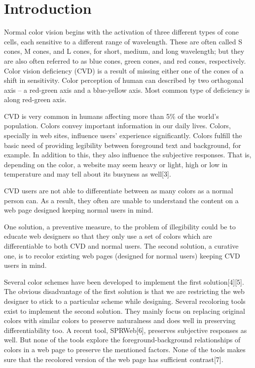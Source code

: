 \chapter{Introduction}
\thispagestyle{plain}

\label{Introduction}

Normal color vision begins with the activation of three different types of cone cells, each sensitive to a different range of wavelength.   These are often called S cones, M cones, and L cones, for short, medium, and long wavelength; but they are also often referred to as blue cones, green cones, and red cones, respectively. Color vision deficiency (CVD) is a result of missing either one of the cones of a shift in sensitivity. Color perception of human can described by two orthogonal axis – a red-green axis and a blue-yellow axis. Most common type of deficiency is  along red-green axis.

CVD is very common in humans affecting more than 5\% of the world's population. Colors convey important information in our daily lives. Colors, specially in web sites, influence users' experience significantly. Colors fulfill the basic need of providing legibility between foreground text and background, for example. In addition to this, they also influence the subjective responses. That is, depending on the color, a website may seem heavy or light, high or low in temperature and may tell about its busyness as well[3]. 

CVD users are not able to differentiate between as many colors as a normal person can. As a result, they often are unable to understand the content on a web page designed keeping normal users in mind.  
  
One solution, a preventive measure, to the problem of illegibility could be to educate web designers so that they only use a set of colors which are differentiable to both CVD and normal users. The second solution, a curative one, is to recolor existing web pages (designed for normal users) keeping CVD users in mind.

Several color schemes have been developed to implement the first solution[4][5]. The obvious disadvantage of the first solution is that we are restricting the web designer to stick to a particular scheme while designing. Several recoloring tools exist to implement the second solution. They mainly focus	on replacing original colors with similar colors to preserve naturalness and does well in preserving differentiability too. A recent tool, SPRWeb[6], preserves subjective responses as well. But none of the tools explore the foreground-background relationships of colors in a web page to preserve the mentioned factors. None of the tools makes sure that the recolored version of the web page has sufficient contrast[7].

